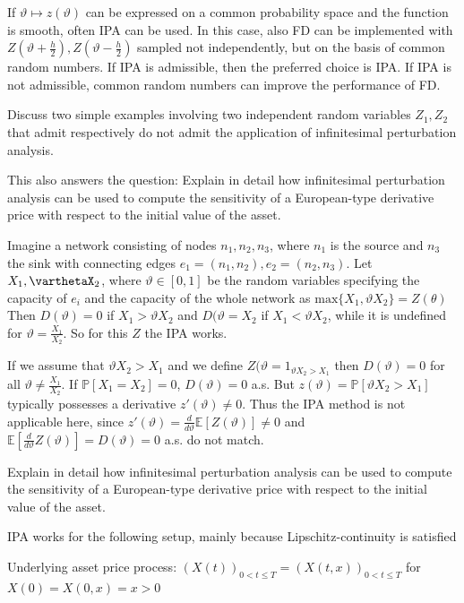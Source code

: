 If \( \vartheta \mapsto z(\vartheta) \) can be expressed on a common probability space and the function is smooth, often IPA can be
used.
In this case, also FD can be implemented with \( Z(ϑ + \frac{h}{2} ), Z (ϑ − \frac{h}{2}) \) sampled not independently, but on the
basis of common random numbers.
If IPA is admissible, then the preferred choice is IPA. If IPA is not admissible, common random numbers can
improve the performance of FD.

Discuss two simple examples involving two independent random variables \( Z_1, Z_2 \)
that admit respectively do not admit the application of infinitesimal perturbation
analysis.

This also answers the question:
Explain in detail how infinitesimal perturbation analysis can be used to compute
the sensitivity of a European-type derivative price with respect to the initial value
of the asset.

Imagine a network consisting of nodes \( n_1, n_2, n_3 \), where \( n_1 \) is the source
and \( n_3 \) the sink with connecting edges \( e_1 = (n_1, n_2), e_2 = (n_2, n_3)\). 
Let \( X_1, \varthetaX_2 \), where \( \vartheta \in [0, 1] \) be the random variables specifying the capacity of \( e_i \)
and the capacity of the whole network as \( \text{max}\{X_1, \vartheta X_2\} = Z(\theta)  \)
Then \( D(\vartheta) = 0 \) if \( X_1 > \vartheta X_2 \) and \( D(\vartheta = X_2 \) if \( X_1 < \vartheta X_2 \),
while it is undefined for \( \vartheta = \frac{X_1}{X_2} \).
So for this \( Z \) the IPA works.

If we assume that \( \vartheta X_2 > X_1  \) and we define \( Z(\vartheta = 1_{\vartheta X_2 > X_1} \)
then \( D(\vartheta) = 0 \) for all \( \vartheta \neq \frac{X_1}{X_2} \). If \( \mathbb{P}[X_1 = X_2] = 0 \), \( D(\vartheta) = 0 \) a.s.
But \( z(\vartheta) =  \mathbb{P}[\vartheta X_2 > X_1]\) typically possesses a derivative \( z'(\vartheta) \neq 0 \).
Thus the IPA method is not applicable here, since 
\( z'(\vartheta) = \frac{d}{d\vartheta}\mathbb{E}[Z(\vartheta)] \neq 0\)
and
\( \mathbb{E}[\frac{d}{d\vartheta}Z(\vartheta)] = D(\vartheta) = 0 \) a.s.
do not match.

Explain in detail how infinitesimal perturbation analysis can be used to compute
the sensitivity of a European-type derivative price with respect to the initial value
of the asset.

IPA works for the following setup, mainly because Lipschitz-continuity is satisfied

Underlying asset price process: 
\( (X(t))_{0 < t \leq T} = (X(t, x))_{0 < t \leq T} \) for \(X(0) = X(0, x) = x > 0 \)


